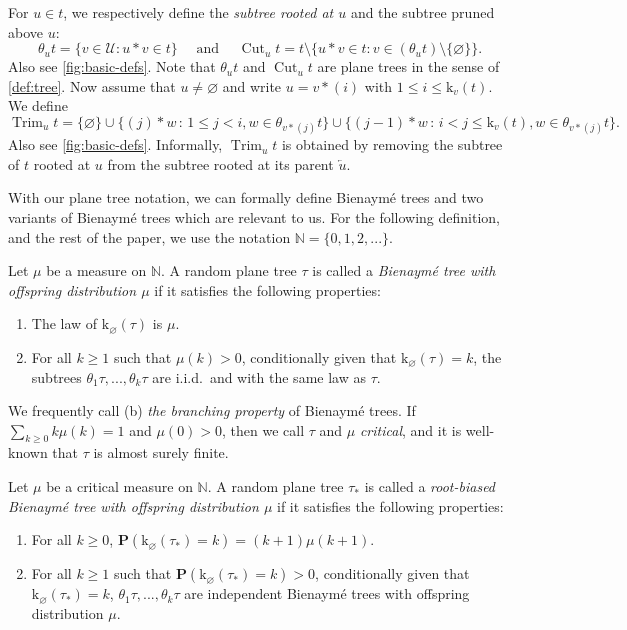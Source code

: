 \documentclass[11pt,reqno]{amsart}
\newcommand{\N}{\mathbb{N}}
\newcommand{\1}{\mathbf{1}}
\newcommand{\0}{\mathbf{0}}
\newcommand{\U}{\mathcal{U}}
\newcommand{\prob}{\mathbf{P}}
\newcommand{\rk}{\mathrm{k}}
\newcommand{\Cut}{\operatorname{Cut}}
\newcommand{\Trim}{\operatorname{Trim}}
\renewcommand{\emptyset}{\varnothing}
\begin{document}
For $u\in t$, we respectively define the \emph{subtree rooted at $u$} and the subtree pruned above $u$:
\[\theta_u t=\{v\in \U :u*v\in t\}\quad\text{ and }\quad \Cut_u t=t\setminus\{u*v\in t: v\in (\theta_u t)\setminus\{\varnothing\}\}.\]
Also see \cref{fig:basic-defs}. 
Note that $\theta_u t$ and $\Cut_u t$ are plane trees in the sense of \cref{def:tree}. Now assume that $u\neq\varnothing$ and write $u=v*(i)$ with $1\leq i\leq \rk_v(t)$. We define
\[\Trim_u t=\{\varnothing\}\cup\{(j)*w\, :\, 1\leq j<i,w\in\theta_{v*(j)}t\}\cup\{(j-1)*w\, :\, i< j\leq \rk_v(t),w\in\theta_{v*(j)}t\}.\]
Also see \cref{fig:basic-defs}. 
Informally, $\Trim_u t$ is obtained by removing the subtree of $t$ rooted at $u$ from the subtree rooted at its parent $\overleftarrow{u}$.

With our plane tree notation, we can formally define Bienaym\'{e} trees and two variants of Bienaym\'{e} trees which are relevant to us. For the following definition, and the rest of the paper, we use the notation $\N = \{0,1,2,...\}$.

\begin{defn}
Let $\mu$ be a measure on $\N$. A random plane tree $\tau$ is called a \emph{Bienaym\'{e} tree with offspring distribution $\mu$} if it satisfies the following properties:
\begin{enumerate}
    \item[(a)] The law of $\rk_\emptyset(\tau)$ is $\mu$.
    \item[(b)] For all $k \geq 1$ such that $\mu(k) > 0$, conditionally given that $\rk_\emptyset(\tau) = k$, the subtrees $\theta_1\tau,...,\theta_k\tau$ are i.i.d.~and with the same law as $\tau$.
\end{enumerate}
We frequently call (b) \emph{the branching property} of Bienaymé trees. If $\sum_{k \geq 0} k\mu(k) = 1$ and $\mu(0) > 0$, then we call $\tau$ and $\mu$ \emph{critical}, and it is well-known that $\tau$ is almost surely finite.
\end{defn}

\begin{defn}
\label{def:root-biased}
Let $\mu$ be a critical measure on $\N$. A random plane tree $\tau_*$ is called a \emph{root-biased Bienaym\'{e} tree with offspring distribution $\mu$} if it satisfies the following properties:
\begin{enumerate}
    \item[(a)] For all $k \geq 0$, $\prob(\rk_\emptyset(\tau_*) = k) = (k+1)\mu(k+1)$.
    \item[(b)] For all $k \geq 1$ such that $\prob(\rk_\emptyset(\tau_*) = k) > 0$, conditionally given that $\rk_{\emptyset}(\tau_*) = k$, $\theta_1\tau,...,\theta_k\tau$ are independent Bienaym\'{e} trees with offspring distribution $\mu$.
\end{enumerate}
\end{defn}
\end{document}
